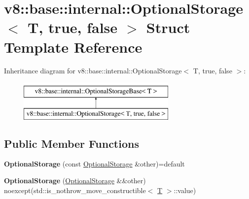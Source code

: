 \hypertarget{structv8_1_1base_1_1internal_1_1OptionalStorage_3_01T_00_01true_00_01false_01_4}{}\section{v8\+:\+:base\+:\+:internal\+:\+:Optional\+Storage$<$ T, true, false $>$ Struct Template Reference}
\label{structv8_1_1base_1_1internal_1_1OptionalStorage_3_01T_00_01true_00_01false_01_4}
Inheritance diagram for v8\+:\+:base\+:\+:internal\+:\+:Optional\+Storage$<$ T, true, false $>$\+:\begin{figure}[H]
\begin{center}
\leavevmode
\includegraphics[height=2.000000cm]{structv8_1_1base_1_1internal_1_1OptionalStorage_3_01T_00_01true_00_01false_01_4}
\end{center}
\end{figure}
\subsection*{Public Member Functions}
\begin{DoxyCompactItemize}
\item 
\mbox{\label{structv8_1_1base_1_1internal_1_1OptionalStorage_3_01T_00_01true_00_01false_01_4_aa3e53f502934002b227eb106c3dc1f80}} 
{\bfseries Optional\+Storage} (const \mbox{\hyperlink{structv8_1_1base_1_1internal_1_1OptionalStorage}{Optional\+Storage}} \&other)=default
\item 
\mbox{\label{structv8_1_1base_1_1internal_1_1OptionalStorage_3_01T_00_01true_00_01false_01_4_a333944ca8f5f7db282c1d7fa2817b942}} 
{\bfseries Optional\+Storage} (\mbox{\hyperlink{structv8_1_1base_1_1internal_1_1OptionalStorage}{Optional\+Storage}} \&\&other) noexcept(std\+::is\+\_\+nothrow\+\_\+move\+\_\+constructible$<$ \mbox{\hyperlink{classv8_1_1internal_1_1torque_1_1T}{T}} $>$\+::value)
\end{DoxyCompactItemize}
